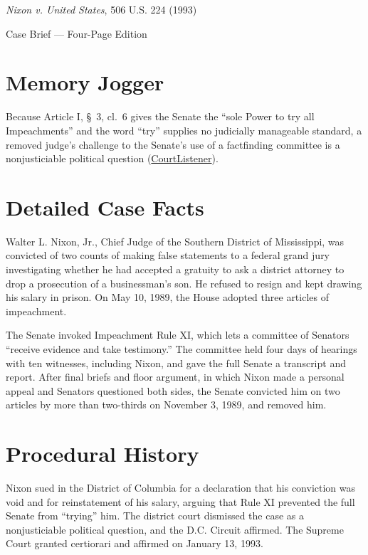 \documentclass[12pt]{article}
\begin{document}
\begin{center}
{\LARGE \textit{Nixon v. United States}, 506 U.S. 224 (1993)\par}
\vspace{0.8em}
{\large Case Brief --- Four-Page Edition\par}
\end{center}
\vspace{1em}

\section{Memory Jogger}

Because Article I, \S~3, cl.~6 gives the Senate the ``sole Power to try all Impeachments'' and the word ``try'' supplies no judicially manageable standard, a removed judge's challenge to the Senate's use of a factfinding committee is a nonjusticiable political question (\href{https://www.courtlistener.com/opinion/112803/nixon-v-united-states/}{CourtListener}).

\section{Detailed Case Facts}

Walter L. Nixon, Jr., Chief Judge of the Southern District of Mississippi, was convicted of two counts of making false statements to a federal grand jury investigating whether he had accepted a gratuity to ask a district attorney to drop a prosecution of a businessman's son. He refused to resign and kept drawing his salary in prison. On May 10, 1989, the House adopted three articles of impeachment.

The Senate invoked Impeachment Rule XI, which lets a committee of Senators ``receive evidence and take testimony.'' The committee held four days of hearings with ten witnesses, including Nixon, and gave the full Senate a transcript and report. After final briefs and floor argument, in which Nixon made a personal appeal and Senators questioned both sides, the Senate convicted him on two articles by more than two-thirds on November 3, 1989, and removed him.

\section{Procedural History}

Nixon sued in the District of Columbia for a declaration that his conviction was void and for reinstatement of his salary, arguing that Rule XI prevented the full Senate from ``trying'' him. The district court dismissed the case as a nonjusticiable political question, and the D.C. Circuit affirmed. The Supreme Court granted certiorari and affirmed on January 13, 1993.
\end{document}
